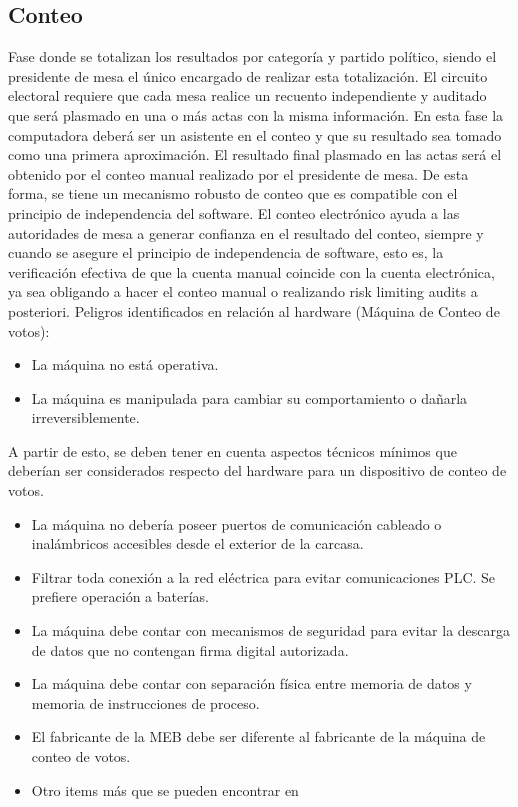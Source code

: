 \subsection{Conteo} Fase donde se totalizan los resultados por categoría y partido político, siendo el presidente de mesa el único encargado de realizar esta totalización. El circuito electoral requiere que cada mesa realice un recuento independiente y auditado que será plasmado en una o más actas con la misma información. En esta fase la computadora deberá ser un asistente en el conteo y que su resultado sea tomado como una primera aproximación. El resultado final plasmado en las actas será el obtenido por el conteo manual realizado por el presidente de mesa. De esta forma, se tiene un mecanismo robusto de conteo que es compatible con el principio de independencia del software. El conteo electrónico ayuda a las autoridades de mesa a generar confianza en el resultado del conteo, siempre y cuando se asegure el principio de independencia de software, esto es, la verificación efectiva de que la cuenta manual coincide con la cuenta electrónica, ya sea obligando a hacer el conteo manual o realizando risk limiting audits a posteriori.\newline
    Peligros identificados en relación al hardware (Máquina de Conteo de votos):
    \begin{itemize}
        \item La máquina no está operativa.
        \item La máquina es manipulada para cambiar su comportamiento o dañarla irreversiblemente.
    \end{itemize}
    A partir de esto, se deben tener en cuenta aspectos técnicos mínimos que deberían ser considerados respecto del hardware para un dispositivo de conteo de votos.
    \begin{itemize}
        \item La máquina no debería poseer puertos de comunicación cableado o inalámbricos accesibles desde el exterior de la carcasa.
        \item Filtrar toda conexión a la red eléctrica para evitar comunicaciones PLC. Se prefiere operación a baterías.
        \item La máquina debe contar con mecanismos de seguridad para evitar la descarga de datos que no contengan firma digital autorizada.
        \item La máquina debe contar con separación física entre memoria de datos y memoria de instrucciones de proceso.
        \item El fabricante de la MEB debe ser diferente al fabricante de la máquina de conteo de votos.
        \item Otro items más que se pueden encontrar en \cite{conicet}
    \end{itemize}
